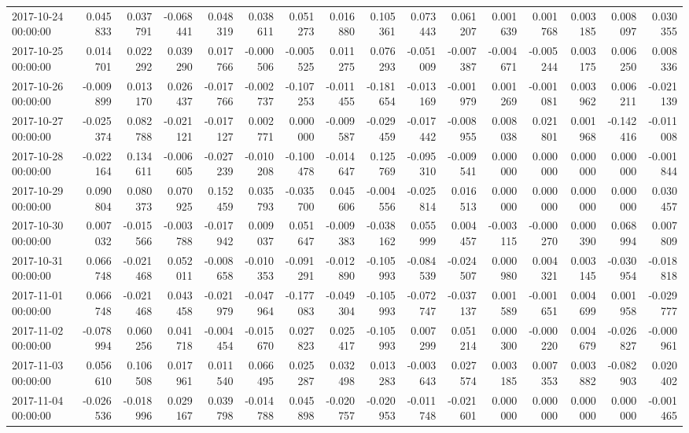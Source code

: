 \begin{tabular}{lrrrrrrrrrrrrrrr}
2017-10-24 00:00:00 & 0.045833 & 0.037791 & -0.068441 & 0.048319 & 0.038611 & 0.051273 & 0.016880 & 0.105361 & 0.073443 & 0.061207 & 0.001639 & 0.001768 & 0.003185 & 0.008097 & 0.030355 \\
2017-10-25 00:00:00 & 0.014701 & 0.022292 & 0.039290 & 0.017766 & -0.000506 & -0.005525 & 0.011275 & 0.076293 & -0.051009 & -0.007387 & -0.004671 & -0.005244 & 0.003175 & 0.006250 & 0.008336 \\
2017-10-26 00:00:00 & -0.009899 & 0.013170 & 0.026437 & -0.017766 & -0.002737 & -0.107253 & -0.011455 & -0.181654 & -0.013169 & -0.001979 & 0.001269 & -0.001081 & 0.003962 & 0.006211 & -0.021139 \\
2017-10-27 00:00:00 & -0.025374 & 0.082788 & -0.021121 & -0.017127 & 0.002771 & 0.000000 & -0.009587 & -0.029459 & -0.017442 & -0.008955 & 0.008038 & 0.021801 & 0.001968 & -0.142416 & -0.011008 \\
2017-10-28 00:00:00 & -0.022164 & 0.134611 & -0.006605 & -0.027239 & -0.010208 & -0.100478 & -0.014647 & 0.125769 & -0.095310 & -0.009541 & 0.000000 & 0.000000 & 0.000000 & 0.000000 & -0.001844 \\
2017-10-29 00:00:00 & 0.090804 & 0.080373 & 0.070925 & 0.152459 & 0.035793 & -0.035700 & 0.045606 & -0.004556 & -0.025814 & 0.016513 & 0.000000 & 0.000000 & 0.000000 & 0.000000 & 0.030457 \\
2017-10-30 00:00:00 & 0.007032 & -0.015566 & -0.003788 & -0.017942 & 0.009037 & 0.051647 & -0.009383 & -0.038162 & 0.055999 & 0.004457 & -0.003115 & -0.000270 & 0.000390 & 0.068994 & 0.007809 \\
2017-10-31 00:00:00 & 0.066748 & -0.021468 & 0.052011 & -0.008658 & -0.010353 & -0.091291 & -0.012890 & -0.105993 & -0.084539 & -0.024507 & 0.000980 & 0.004321 & 0.003145 & -0.030954 & -0.018818 \\
2017-11-01 00:00:00 & 0.066748 & -0.021468 & 0.043458 & -0.021979 & -0.047964 & -0.177083 & -0.049304 & -0.105993 & -0.072747 & -0.037137 & 0.001589 & -0.001651 & 0.004699 & 0.001958 & -0.029777 \\
2017-11-02 00:00:00 & -0.078994 & 0.060256 & 0.041718 & -0.004454 & -0.015670 & 0.027823 & 0.025417 & -0.105993 & 0.007299 & 0.051214 & 0.000300 & -0.000220 & 0.004679 & -0.026827 & -0.000961 \\
2017-11-03 00:00:00 & 0.056610 & 0.106508 & 0.017961 & 0.011540 & 0.066495 & 0.025287 & 0.032498 & 0.013283 & -0.003643 & 0.027574 & 0.003185 & 0.007353 & 0.003882 & -0.082903 & 0.020402 \\
2017-11-04 00:00:00 & -0.026536 & -0.018996 & 0.029167 & 0.039798 & -0.014788 & 0.045898 & -0.020757 & -0.020953 & -0.011748 & -0.021601 & 0.000000 & 0.000000 & 0.000000 & 0.000000 & -0.001465 \\

\end{tabular}
